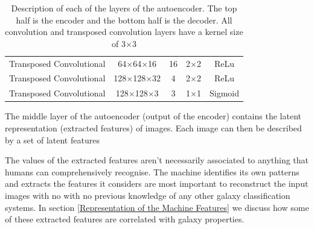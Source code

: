 \documentclass[12pt, onecolumn]{article}
\begin{document}
\begin{table}[H]
\begin{tabular}{c c c c c}
                Transposed Convolutional & 64$\times$64$\times$16 & 16 & 2$\times$2 & ReLu \\
    
                Transposed Convolutional & 128$\times$128$\times$32 & 4 & 2$\times$2 & ReLu \\
    
                Transposed Convolutional & 128$\times$128$\times$3 & 3 & 1$\times$1 & Sigmoid \\


            \end{tabular}
            \caption{Description of each of the layers of the autoencoder. The top half is the encoder and the bottom half is the decoder. All convolution and transposed convolution layers have a kernel size of 3$\times$3}
            \label{autoencoder_layers}
        \end{table}


        
        

        The middle layer of the autoencoder (output of the encoder) contains the latent representation (extracted features) of images. Each image can then be described by a set of latent features
        
        The values of the extracted features aren't necessarily associated to anything that humans can comprehensively recognise. The machine identifies its own patterns and extracts the features it considers are most important to reconstruct the input images with no with no previous knowledge of any other galaxy classification systems. In section \ref{Representation of the Machine Features} we discuss how some of these extracted features are correlated with galaxy properties.

        
\end{document}
